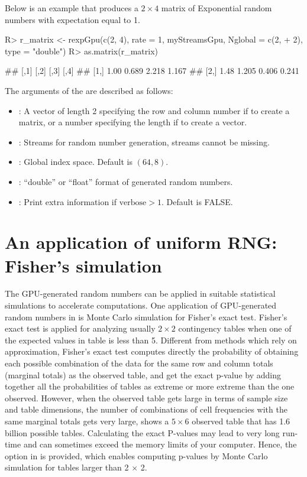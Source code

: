 \documentclass[article,nojss]{jss}\usepackage[]{graphicx}\usepackage[]{color}
\newcommand{\fct}[1]{\code{#1()}}
\begin{document}
Below is an example that produces a $2 \times 4$ matrix of Exponential random numbers with expectation equal to 1.
\begin{CodeChunk}
\begin{CodeInput}
R> r_matrix <- rexpGpu(c(2, 4), rate = 1, myStreamsGpu, Nglobal = c(2,
+    2), type = "double")
R> as.matrix(r_matrix)
\end{CodeInput}
\begin{CodeOutput}
##      [,1]  [,2]  [,3]  [,4]
## [1,] 1.00 0.689 2.218 1.167
## [2,] 1.48 1.205 0.406 0.241
\end{CodeOutput} 
\end{CodeChunk} 

The arguments of the \fct{rexpGpu} are described as follows:
\begin{itemize}
\itemsep0em 
  \item {}: A vector of length 2 specifying the row and column number if to create a matrix, or a number specifying the length if to create a vector.
  \item {}: Streams for random number generation, streams cannot be missing.
  \item {}: Global index space. Default is $(64,8)$.
  \item {}: ``double'' or ``float'' format of generated random numbers.
  \item {}: Print extra information if $\text{verbose} > 1$. Default is FALSE.
\end{itemize}





\section{An application of uniform RNG: Fisher's simulation}
The GPU-generated random numbers can be applied in suitable statistical simulations to accelerate computations.
One application of GPU-generated random numbers in  is Monte Carlo simulation for Fisher's exact test. Fisher’s exact test is applied for analyzing usually $2 \times 2$ contingency tables when one of the expected values in table is less than 5. Different from methods which rely on approximation, Fisher's exact test computes directly the probability of obtaining each possible combination of the data for the same row and column totals (marginal totals) as the observed table, and get the exact p-value by adding together all the probabilities of tables as extreme or more extreme than the one observed. However, when the observed table gets large in terms of sample size and table dimensions, the number of combinations of cell frequencies with the same marginal totals gets very large, \cite[][p. 23]{mehta2011ibm} shows a $5 \times 6$ observed table that has 1.6 billion possible tables. Calculating the exact P-values may lead to very long run-time and can sometimes exceed the memory limits of your computer. Hence, the option  in \fct{stats::fisher.test} is provided, which enables computing p-values by Monte Carlo simulation for tables larger than 2 $\times$ 2. 
\end{document}
